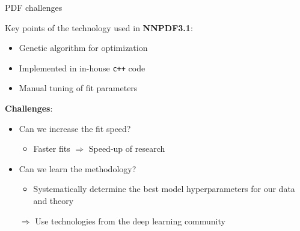 \documentclass[aspectratio=169,10pt]{beamer}
\begin{document}
\begin{frame}[t]{PDF challenges}

Key points of the technology used in \textbf{NNPDF3.1}:
    \begin{itemize}
        \item Genetic algorithm for optimization
        \item Implemented in in-house \texttt{c++} code
        \item Manual tuning of fit parameters
    \end{itemize}
\vspace*{1em}

\textbf{Challenges}:
\begin{itemize}
    \item Can we increase the fit speed?
    \begin{itemize}
        \item Faster fits $\Rightarrow$ Speed-up of research
    \end{itemize}
    \item Can we learn the methodology?
    \begin{itemize}
        \item Systematically determine the {best model hyperparameters} for our data and theory
    \end{itemize}
\end{itemize}

\vspace*{1em}
\begin{itemize}
\item[$\Rightarrow$] Use technologies from the deep learning community
\end{itemize}

\end{frame}
\end{document}
